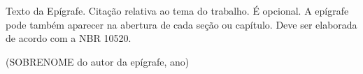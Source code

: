 \begin{epigrafe}
    \vspace*{\fill}
    \noindent\hfill
    \begin{minipage}{0.5\textwidth}
        \normalfont\normalsize\SingleSpacing
        Texto da Epígrafe. Citação relativa ao tema do trabalho. É opcional. A epígrafe pode também aparecer na abertura de cada seção ou capítulo. Deve ser elaborada de acordo com a NBR 10520.
        \par\vspace*{\baselineskip}
        \begin{flushright}
        (SOBRENOME do autor da epígrafe, ano)
        \end{flushright}
    \end{minipage}
\end{epigrafe}
